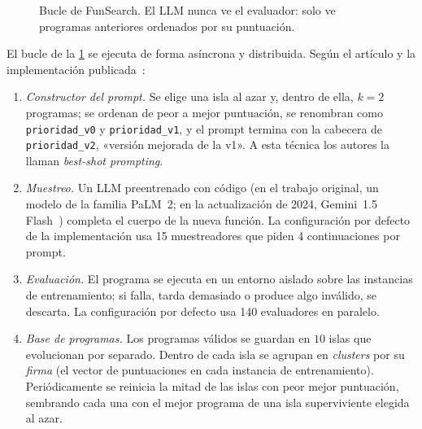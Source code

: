 \begin{figure}[h]
\centering
{}
\caption{Bucle de FunSearch. El LLM nunca ve el evaluador: solo ve programas anteriores ordenados por su puntuación.}
\label{fig:funsearch}
\end{figure}

El bucle de la \cref{fig:funsearch} se ejecuta de forma asíncrona y distribuida. Según el artículo y la implementación publicada~\cite{funsearch,funsearch-code}:
\begin{enumerate}[label=\arabic*.]
  \item \emph{Constructor del prompt.} Se elige una isla al azar y, dentro de ella, $k=2$ programas; se ordenan de peor a mejor puntuación, se renombran como \texttt{prioridad\_v0} y \texttt{prioridad\_v1}, y el prompt termina con la cabecera de \texttt{prioridad\_v2}, «versión mejorada de la v1». A esta técnica los autores la llaman \emph{best-shot prompting}.
  \item \emph{Muestreo.} Un LLM preentrenado con código (en el trabajo original, un modelo de la familia PaLM~2; en la actualización de 2024, Gemini~1.5 Flash~\cite{fs-blog}) completa el cuerpo de la nueva función. La configuración por defecto de la implementación usa 15 muestreadores que piden 4 continuaciones por prompt.
  \item \emph{Evaluación.} El programa se ejecuta en un entorno aislado sobre las instancias de entrenamiento; si falla, tarda demasiado o produce algo inválido, se descarta. La configuración por defecto usa 140 evaluadores en paralelo.
  \item \emph{Base de programas.} Los programas válidos se guardan en $10$ islas que evolucionan por separado. Dentro de cada isla se agrupan en \emph{clusters} por su \emph{firma} (el vector de puntuaciones en cada instancia de entrenamiento). Periódicamente se reinicia la mitad de las islas con peor mejor puntuación, sembrando cada una con el mejor programa de una isla superviviente elegida al azar.
\end{enumerate}

